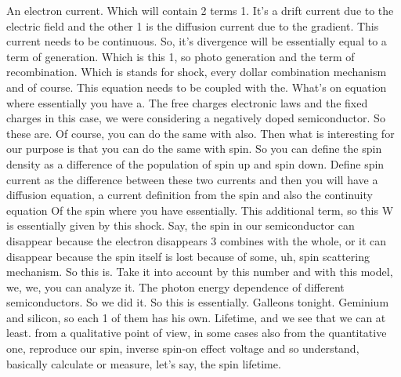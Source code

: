An electron current. Which will contain 2 terms 1. It's a drift current due to the electric field and the other 1 is the diffusion current due to the gradient. This current needs to be continuous. So, it's divergence will be essentially equal to a term of generation. Which is this 1, so photo generation and the term of recombination. Which is stands for shock, every dollar combination mechanism and of course. This equation needs to be coupled with the. What's on equation where essentially you have a. The free charges electronic laws and the fixed charges in this case, we were considering a negatively doped semiconductor. So these are. Of course, you can do the same with also. Then what is interesting for our purpose is that you can do the same with spin. So you can define the spin density as a difference of the population of spin up and spin down. Define spin current as the difference between these two currents and then you will have a diffusion equation, a current definition from the spin and also the continuity equation Of the spin where you have essentially. This additional term, so this W is essentially given by this shock. Say, the spin in our semiconductor can disappear because the electron disappears 3 combines with the whole, or it can disappear because the spin itself is lost because of some, uh, spin scattering mechanism. So this is. Take it into account by this number and with this model, we, we, you can analyze it. The photon energy dependence of different semiconductors. So we did it. So this is essentially. Galleons tonight. Geminium and silicon, so each 1 of them has his own. Lifetime, and we see that we can at least. from a qualitative point of view, in some cases also from the quantitative one, reproduce our spin, inverse spin-on effect voltage and so understand, basically calculate or measure, let's say, the spin lifetime.
